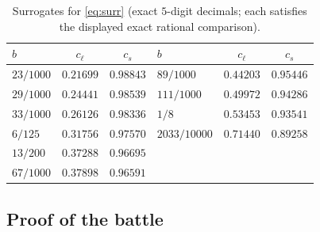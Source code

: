 \documentclass[11pt]{article}
\theoremstyle{remark}
\theoremstyle{plain}
\theoremstyle{plain}
\begin{document}
\begin{table}[h]\centering
\caption{Surrogates for \eqref{eq:surr} (exact $5$-digit decimals;
each satisfies the displayed exact rational comparison).}\label{tab:surr}
\begin{tabular}{lcc@{\qquad}lcc}
\toprule
$b$ & $c_\ell$ & $c_s$ & $b$ & $c_\ell$ & $c_s$\\
\midrule
$23/1000$ & $0.21699$ & $0.98843$ & $89/1000$ & $0.44203$ & $0.95446$\\
$29/1000$ & $0.24441$ & $0.98539$ & $111/1000$ & $0.49972$ & $0.94286$\\
$33/1000$ & $0.26126$ & $0.98336$ & $1/8$ & $0.53453$ & $0.93541$\\
$6/125$ & $0.31756$ & $0.97570$ & $2033/10000$ & $0.71440$ & $0.89258$\\
$13/200$ & $0.37288$ & $0.96695$ & & &\\
$67/1000$ & $0.37898$ & $0.96591$ & & &\\
\bottomrule
\end{tabular}
\end{table}

\subsection{Proof of the battle}
\end{document}
